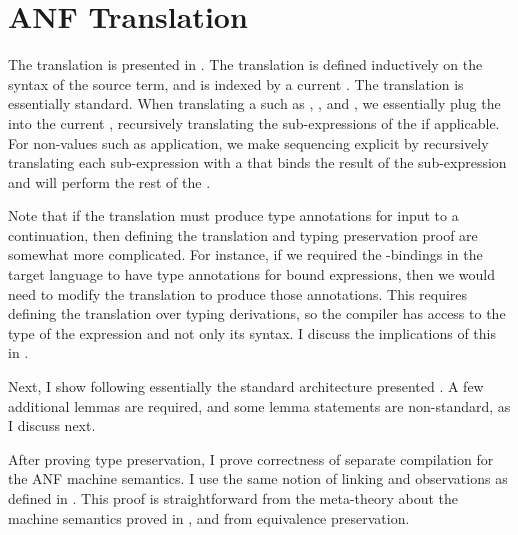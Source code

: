 \section{{{ANF}} Translation}
\label{sec:anf:trans}

\FigTrans

The  translation is presented in .
The translation is defined inductively on the syntax of the source term, and is
indexed by a current .
The translation is essentially standard.
When translating a  such as \im{\sx}, \im{\sfune{\sx}{\sA}{\se}},
and , we essentially plug the  into the current
, recursively translating the sub-expressions of the
 if applicable.
For non-values such as application, we make sequencing explicit by recursively
translating each sub-expression with a  that binds the result
of the sub-expression and will perform the rest of the .

Note that if the translation must produce type annotations for input to a
continuation, then defining the translation and typing preservation proof are
somewhat more complicated.
For instance, if we required the -bindings in the target
language to have type annotations for bound expressions, then we would need to
modify the translation to produce those annotations.
This requires defining the translation over typing derivations, so the compiler
has access to the type of the expression and not only its syntax.
I discuss the implications of this in .

Next, I show  following essentially the standard
architecture presented .
A few additional lemmas are required, and some lemma statements are non-standard,
as I discuss next.

After proving type preservation, I prove correctness of separate compilation for
the ANF machine semantics.
I use the same notion of linking and observations as defined in .
This proof is straightforward from the meta-theory about the machine semantics
proved in , and from equivalence preservation.

